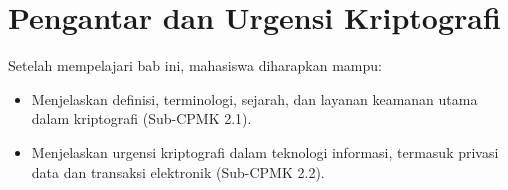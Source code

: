 \documentclass[../../main.tex]{subfiles}
\begin{document}
\chapter{Pengantar dan Urgensi Kriptografi}
\label{chap:pengantar}

\begin{learningoutcome}
Setelah mempelajari bab ini, mahasiswa diharapkan mampu:
\begin{itemize}
    \item Menjelaskan definisi, terminologi, sejarah, dan layanan keamanan utama dalam kriptografi (Sub-CPMK 2.1).
    \item Menjelaskan urgensi kriptografi dalam teknologi informasi, termasuk privasi data dan transaksi elektronik (Sub-CPMK 2.2).
\end{itemize}
\end{learningoutcome}












\end{document}
